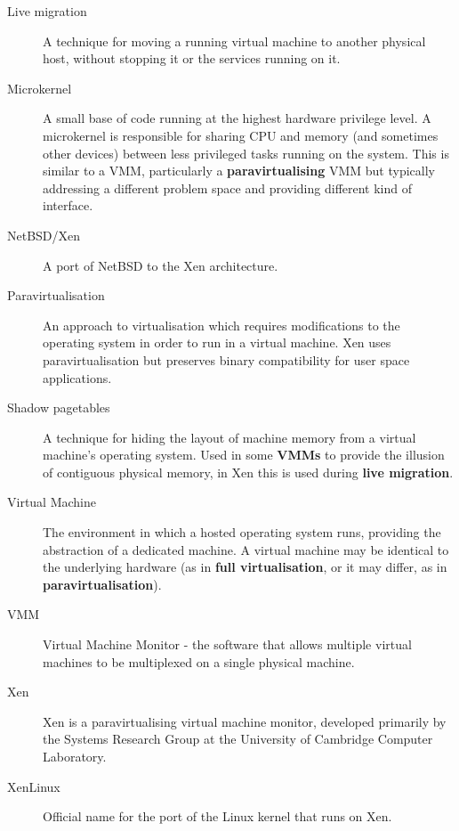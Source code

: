 \begin{description}
\item[Live migration] A technique for moving a running virtual machine
  to another physical host, without stopping it or the services
  running on it.

\item[Microkernel] A small base of code running at the highest
  hardware privilege level.  A microkernel is responsible for sharing
  CPU and memory (and sometimes other devices) between less privileged
  tasks running on the system.  This is similar to a VMM, particularly
  a {\bf paravirtualising} VMM but typically addressing a different
  problem space and providing different kind of interface.

\item[NetBSD/Xen] A port of NetBSD to the Xen architecture.

\item[Paravirtualisation] An approach to virtualisation which requires
  modifications to the operating system in order to run in a virtual
  machine.  Xen uses paravirtualisation but preserves binary
  compatibility for user space applications.

\item[Shadow pagetables] A technique for hiding the layout of machine
  memory from a virtual machine's operating system.  Used in some {\bf
    VMMs} to provide the illusion of contiguous physical memory, in
  Xen this is used during {\bf live migration}.

\item[Virtual Machine] The environment in which a hosted operating
  system runs, providing the abstraction of a dedicated machine.  A
  virtual machine may be identical to the underlying hardware (as in
  {\bf full virtualisation}, or it may differ, as in {\bf
    paravirtualisation}).

\item[VMM] Virtual Machine Monitor - the software that allows multiple
  virtual machines to be multiplexed on a single physical machine.

\item[Xen] Xen is a paravirtualising virtual machine monitor,
  developed primarily by the Systems Research Group at the University
  of Cambridge Computer Laboratory.

\item[XenLinux] Official name for the port of the Linux kernel that
  runs on Xen.

\end{description}

